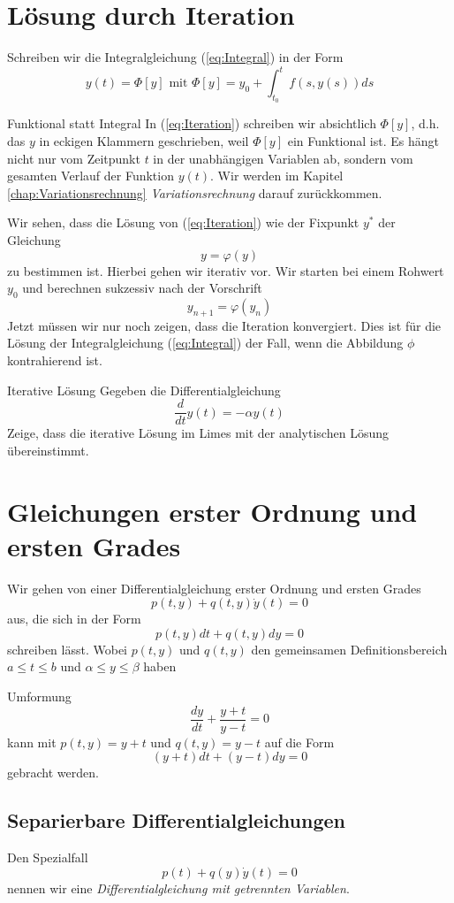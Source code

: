 \section{Lösung durch Iteration}
Schreiben wir die Integralgleichung (\ref{eq:Integral}) in der Form
\begin{equation}
  y(t)=\Phi[y]\mbox{ mit } \Phi[y]=y_0+\int_{t_0}^t f(s,y(s))ds
  \label{eq:Iteration}
\end{equation}
\begin{note}{Funktional statt Integral}
  In (\ref{eq:Iteration}) schreiben wir absichtlich $\Phi[y]$, d.h. das $y$ in
  eckigen Klammern geschrieben, weil $\Phi[y]$ ein Funktional ist. Es hängt
  nicht nur vom Zeitpunkt $t$ in der unabhängigen Variablen ab, sondern vom
  gesamten Verlauf der Funktion $y(t)$. Wir werden im Kapitel \ref{chap:Variationsrechnung} \textit{Variationsrechnung} darauf zurückkommen. 
\end{note}
Wir sehen, dass die Lösung von (\ref{eq:Iteration}) wie der Fixpunkt $y^*$ der Gleichung \[ y=\varphi(y)\] zu bestimmen ist. Hierbei gehen wir iterativ vor. Wir starten bei einem Rohwert $y_0$ und berechnen sukzessiv nach der Vorschrift
\[ y_{n+1} = \varphi(y_n) \] 
Jetzt müssen wir nur noch zeigen, dass die Iteration konvergiert. Dies ist für die Lösung der Integralgleichung (\ref{eq:Integral}) der Fall, wenn die
Abbildung $\phi$ kontrahierend ist.
\begin{example}{Iterative Lösung}
Gegeben die Differentialgleichung
\[
  \frac{d}{dt}y(t)=-\alpha y(t) 
\]
Zeige, dass die iterative Lösung im Limes mit der analytischen Lösung
übereinstimmt.
\end{example}
\section{Gleichungen erster Ordnung und ersten Grades}
Wir gehen von einer Differentialgleichung erster Ordnung und ersten Grades 
\[   p(t,y)+q(t,y)\dot{y}(t)=0 \]
aus, die sich in der Form
\begin{equation}\label{eq:DGLVarKoeff}
  p(t,y)dt+q(t,y)dy=0
\end{equation}
schreiben lässt. Wobei $p(t,y)$ und $q(t,y)$ den gemeinsamen Definitionsbereich
$a\le t\le b$ und $\alpha\le y\le\beta$ haben
\begin{example}{Umformung}
  \[\frac{dy}{dt}+\frac{y+t}{y-t}=0\]
  kann mit $p(t,y)=y+t$ und $q(t,y)=y-t$ auf die Form
  \[(y+t)dt+(y-t)dy=0\]
  gebracht werden.
\end{example}
\subsection{Separierbare Differentialgleichungen}
Den Spezialfall
\begin{equation}
  p(t)+q(y)\dot{y}(t)=0
  \label{eq:getrennteVar}
\end{equation}
nennen wir eine {\it Differentialgleichung mit getrennten Variablen}.

